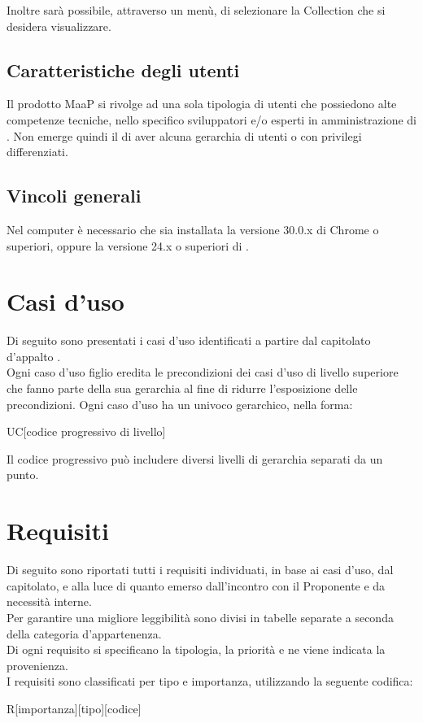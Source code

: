 Inoltre sarà possibile, attraverso un menù, di selezionare la Collection che si desidera visualizzare.

\subsection{Caratteristiche degli utenti}
\label{2.3}
Il prodotto MaaP si rivolge ad una sola tipologia di utenti che possiedono alte competenze tecniche, nello specifico sviluppatori e/o esperti in amministrazione di .
Non emerge quindi il  di aver alcuna gerarchia di utenti o con privilegi differenziati.

\subsection{Vincoli generali}
\label{2.4}
Nel computer è necessario che sia installata la versione 30.0.x di  Chrome o superiori, oppure la versione 24.x o superiori di .

\newpage
\section{Casi d'uso} %
\label{3.0}
Di seguito sono presentati i casi d'uso identificati a partire dal capitolato d'appalto \Progetto. \\
Ogni caso d'uso figlio eredita le precondizioni dei casi d'uso di livello superiore che fanno parte della sua gerarchia al fine di ridurre l'esposizione delle precondizioni.
Ogni caso d'uso ha un  univoco gerarchico, nella forma:
\begin{center}
UC[codice progressivo di livello]
\end{center}
Il codice progressivo può includere diversi livelli di gerarchia separati da un punto.



\newpage


\newpage


\newpage
\section{Requisiti} %
\label{4.0}
Di seguito sono riportati tutti i requisiti individuati, in base ai casi d'uso, dal capitolato, e alla luce di quanto emerso dall'incontro con il Proponente e da necessità interne.\\
Per garantire una migliore leggibilità sono divisi in tabelle separate a seconda della categoria d'appartenenza.\\
Di ogni requisito si specificano la tipologia, la priorità e ne viene indicata la provenienza.\\
I requisiti sono classificati per tipo e importanza, utilizzando la seguente codifica:\\
\begin{center}
R[importanza][tipo][codice]
\end{center}

